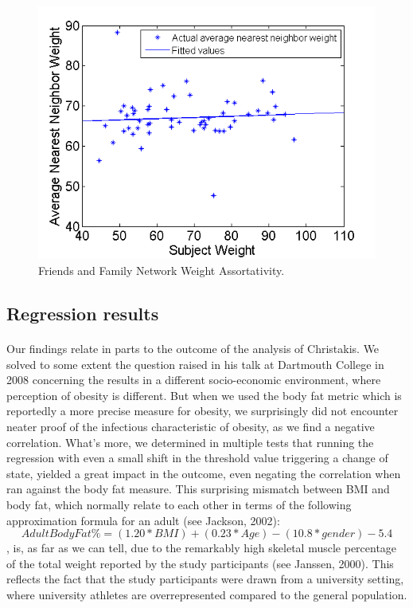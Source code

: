 \documentclass[11pt]{article}
\begin{document}
\begin{figure}[!h]
\center
   \includegraphics[scale=0.72]{weight_assortativity_figure3.png}
   \caption{\label{3} Friends and Family Network Weight Assortativity.}
\end{figure}


\subsection{Regression results}
\paragraph{}
Our findings relate in parts to the outcome of the analysis of Christakis. We solved to some extent the question raised in his talk at Dartmouth College in 2008 concerning the results in a different socio-economic environment, where perception of obesity is different. But when we used the body fat metric which is reportedly a more precise measure for obesity, we surprisingly did not encounter neater proof of the infectious characteristic of obesity, as we find a negative correlation. What's more, we determined in multiple tests that running the regression with even a small shift in the threshold value triggering a change of state, yielded a great impact in the outcome, even negating the correlation when ran against the body fat measure. This surprising mismatch between BMI and body fat, which normally relate to each other in terms of the following approximation formula for an adult (see Jackson, 2002): 
\[Adult Body Fat \% = (1.20 * BMI) + (0.23 * Age) - (10.8 * gender) - 5.4\]
, is, as far as we can tell, due to the remarkably high skeletal muscle percentage of the total weight reported by the study participants (see Janssen, 2000). This reflects the fact that the study participants were drawn from a university setting, where university athletes are overrepresented compared to the general population. 
\end{document}
